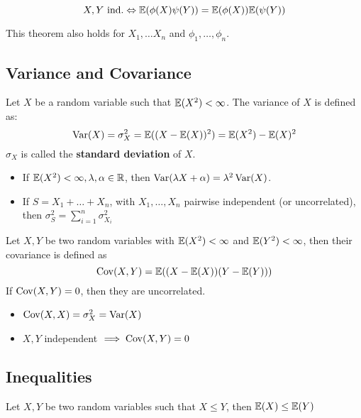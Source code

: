 \begin{theorem*}
  \[X, Y \ \text{ind.} \Leftrightarrow \mathbb{E}(\phi(X) \psi(Y)) = \mathbb{E}(\phi(X)) \mathbb{E}(\psi(Y))\]
\end{theorem*}
This theorem also holds for \(X_1, \ldots X_n\) and \(\phi_1, \ldots, \phi_n\).

\subsection{Variance and Covariance}
\begin{definition*}[Variance]
  Let \(X\) be a random variable such that \(\mathbb{E}(X^2) < \infty\). The variance of \(X\) is defined as:
  \[\operatorname{Var}(X) = \sigma_X^2 = \mathbb{E}((X - \mathbb{E}(X))^2) = \mathbb{E}(X^2) - \mathbb{E}(X)^2\]
  \(\sigma_X\) is called the \textbf{standard deviation} of \(X\).
\end{definition*}

\begin{itemize}
  \item If \(\mathbb{E}(X^2) < \infty, \lambda, \alpha \in \mathbb{R}\), then \(\operatorname{Var}(\lambda X + \alpha) = \lambda^2 \operatorname{Var}(X)\).
  \item If \(S = X_1 + \ldots + X_n\), with \(X_1, \ldots, X_n\) pairwise independent (or uncorrelated), then \(\sigma_S^2 = \sum_{i = 1}^n \sigma_{X_i}^2\)
\end{itemize}

\begin{definition*}[Covariance]
  Let \(X, Y\) be two random variables with \(\mathbb{E}(X^2) < \infty\) and \(\mathbb{E}(Y^2) < \infty\), then their covariance is defined as
  \vspace{-7pt}
  \[\operatorname{Cov}(X, Y) = \mathbb{E}((X - \mathbb{E}(X))(Y - \mathbb{E}(Y)))\]
  If \(\operatorname{Cov}(X, Y) = 0\), then they are uncorrelated.
\end{definition*}
\begin{itemize}
  \item \(\operatorname{Cov}(X, X) = \sigma_X^2 = \operatorname{Var}(X)\)
  \item \(X, Y\) independent \(\implies \operatorname{Cov}(X, Y) = 0\)
\end{itemize}

\subsection{Inequalities}
\begin{lemma}[Monotonicity]
  Let \(X, Y\) be two random variables such that \(X \leq Y\), then \(\mathbb{E}(X) \leq \mathbb{E}(Y)\)
\end{lemma}

